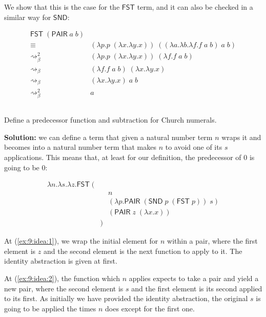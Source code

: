 \documentclass{article}
\begin{document}
We show that this is the case for the $\mathsf{FST}$ term, and 
it can also be checked in a similar way for $\mathsf{SND}$:

\begin{align*}
  \mathsf{FST}\;(\mathsf{PAIR}\;a\;b) & \\
  \equiv&
    (\lambda p.p\;(\lambda x.\lambda y.x))\;
    ((\lambda a.\lambda b.\lambda f.f\;a\;b)\;a\;b) \\
  \rightsquigarrow_\beta^2&
    (\lambda p.p\;(\lambda x.\lambda y.x))\;
    (\lambda f.f\;a\;b) \\
  \rightsquigarrow_\beta&
    (\lambda f.f\;a\;b)\;
    (\lambda x.\lambda y.x) \\
  \rightsquigarrow_\beta&
    (\lambda x.\lambda y.x)\;a\;b \\
  \rightsquigarrow_\beta^2&
    a
\end{align*}

\subsection{}\label{ex:9}

Define a predecessor function and subtraction for Church numerals.

\textbf{Solution:} we can define a term that given a natural 
number term $n$ wraps it and becomes into a natural number term 
that makes $n$ to avoid one of its $s$ applications. This means 
that, at least for our definition, the predecessor of 0 is going 
to be 0:

\begin{align*}
\lambda n.\lambda s.\lambda z.\mathsf{FST}\;( 
    \label{ex:9:idea:3}\tag{3} \\
    &\;\;\;\;n \\
    &\;\;\;\;(
      \lambda p.
        \mathsf{PAIR}\;(\mathsf{SND}\;p\;(\mathsf{FST}\;p))\;s
    ) \label{ex:9:idea:2}\tag{2} \\
    &\;\;\;\;(\mathsf{PAIR}\;z\;(\lambda x.x))
      \label{ex:9:idea:1}\tag{1} \\
  &)
\end{align*}

At (\ref{ex:9:idea:1}), we wrap the initial element for $n$ within 
a pair, where the first element is $z$ and the second 
element is the next function to apply to it. The identity 
abstraction is given at first.

At (\ref{ex:9:idea:2}), the function which $n$ applies expects to 
take a pair and yield a new pair, where the second element is $s$ 
and the first element is its second applied to its first. As 
initially we have provided the identity abstraction, the original 
$s$ is going to be applied the times $n$ does except for the 
first one.
\end{document}
